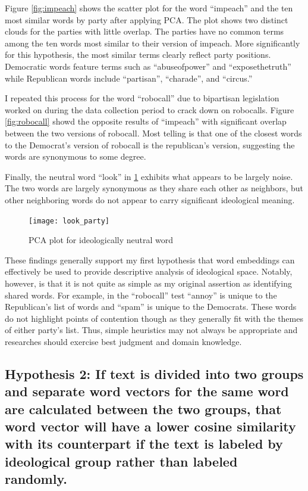 \documentclass[../embeddings.tex]{subfiles}
\begin{document}
Figure \ref{fig:impeach} shows the scatter plot for the word ``impeach'' and the ten most similar words by party after applying PCA. The plot shows two distinct clouds for the parties with little overlap. The parties have no common terms among the ten words most similar to their version of impeach. More significantly for this hypothesis, the most similar terms clearly reflect party positions. Democratic words feature terms such as ``abuseofpower'' and ``exposethetruth'' while Republican words include ``partisan'', ``charade'', and ``circus.''

I repeated this process for the word ``robocall'' due to bipartisan legislation worked on during the data collection period to crack down on robocalls. Figure \ref{fig:robocall} showd the opposite results of ``impeach'' with significant overlap between the two versions of robocall. Most telling is that one of the closest words to the Democrat's version of robocall is the republican's version, suggesting the words are synonymous to some degree. 

Finally, the neutral word ``look'' in \ref{fig:look} exhibits what appears to be largely noise. The two words are largely synonymous as they share each other as neighbors, but other neighboring words do not appear to carry significant ideological meaning.

\begin{figure}[h]
  \centering
  \texttt{[image: look\_party]}
  \caption{PCA plot for ideologically neutral word}
  \label{fig:look}
\end{figure}

These findings generally support my first hypothesis that word embeddings can effectively be used to provide descriptive analysis of ideological space. Notably, however, is that it is not quite as simple as my original assertion as identifying shared words. For example, in the ``robocall'' test ``annoy'' is unique to the Republican's list of words and ``spam'' is unique to the Democrats. These words do not highlight points of contention though as they generally fit with the themes of either party's list. Thus, simple heuristics may not always be appropriate and researches should exercise best judgment and domain knowledge.

\subsection{Hypothesis 2: If text is divided into two groups and separate word vectors for the same word are calculated between the two groups, that word vector will have a lower cosine similarity with its counterpart if the text is labeled by ideological group rather than labeled randomly.}
\end{document}
